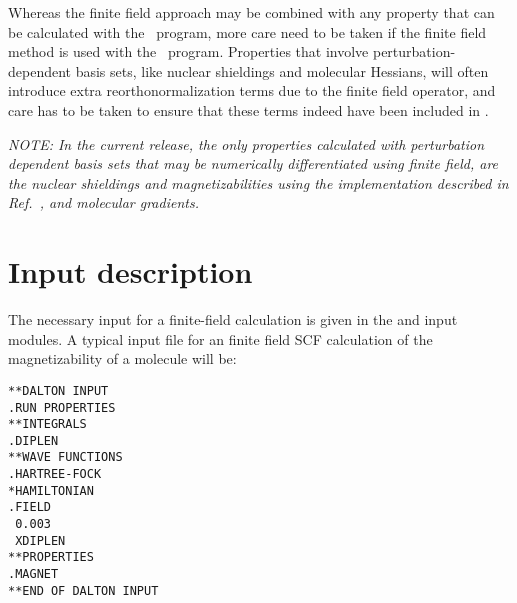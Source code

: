 Whereas the finite field approach may be combined with any property
that can be calculated with the \resp\ program, more care need to be
taken if the finite field method is used with the \aba\
program. Properties that involve perturbation-dependent basis
sets,
like nuclear shieldings and molecular Hessians, will often introduce
extra reorthonormalization terms due to the finite field operator, and
care has to be taken to ensure that these terms indeed have been
included in \siraba . 

{\em NOTE: In the current release, the only properties
calculated with perturbation dependent basis sets that may be
numerically differentiated using finite field, are the nuclear shieldings
and magnetizabilities using the implementation described in
Ref.~\cite{arthkrabmjpjjcp102}, and molecular gradients.} 

\section{Input description}\label{sec:finiteinput}

\begin{center}
\end{center}

The necessary input for a finite-field calculation
is given in the 
 and  input modules. A typical input file
for an finite field SCF calculation of the
magnetizability of a molecule will be:

\begin{verbatim}
**DALTON INPUT
.RUN PROPERTIES
**INTEGRALS
.DIPLEN
**WAVE FUNCTIONS
.HARTREE-FOCK
*HAMILTONIAN
.FIELD
 0.003
 XDIPLEN
**PROPERTIES
.MAGNET
**END OF DALTON INPUT
\end{verbatim}

